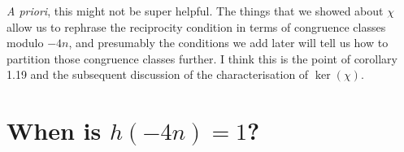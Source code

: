 \emph{A priori}, this might not be super helpful. The things that we showed about $\chi$ allow us to rephrase the reciprocity condition in terms of congruence classes modulo $-4n$, and presumably the conditions we add later will tell us how to partition those congruence classes further. I think this is the point of corollary 1.19 and the subsequent discussion of the characterisation of $\ker(\chi)$.

\section{When is $h(-4n)=1$?}
